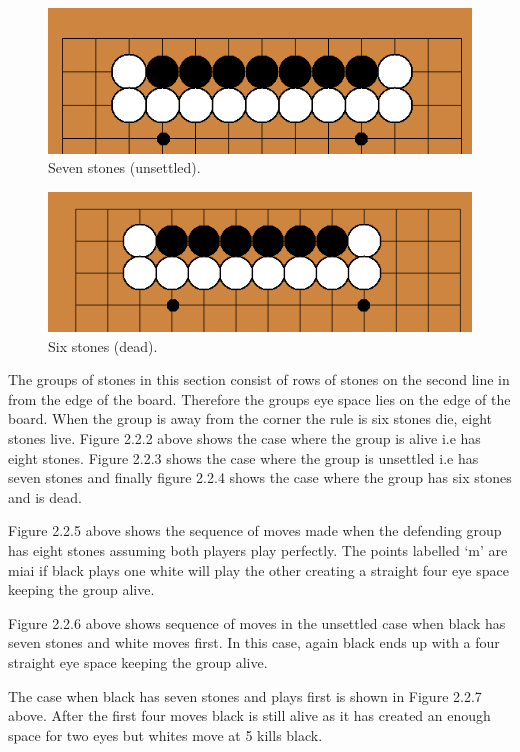 \documentclass{l3proj}
\begin{document}
\begin{figure}[H]
\centering
\includegraphics[scale=0.5]{Images/sevenunsettled.png}
\caption{Seven stones (unsettled).}
\end{figure}

\begin{figure}[H]
\centering
\includegraphics[scale=0.5]{Images/sixdie.png}
\caption{Six stones (dead).}
\end{figure}

The groups of stones in this section consist of rows of stones on the second line in from the edge of the board.  Therefore the groups eye space lies on the edge of the board. When the group is away from the corner the rule is six stones die, eight stones live. Figure 2.2.2 above shows the case where the group is alive i.e has eight stones. Figure 2.2.3 shows the case where the group is unsettled i.e has seven stones and finally figure 2.2.4 shows the case where the group has six stones and is dead.

Figure 2.2.5 above shows the sequence of moves made when the defending group has eight stones assuming both players play perfectly. The points labelled ‘m’ are miai if black plays one white will play the other creating a straight four eye space keeping the group alive.

Figure 2.2.6 above shows sequence of moves in the unsettled case when black has seven stones and white moves first.  In this case, again black ends up with a four straight eye space keeping the group alive.

The case when black has seven stones and plays first is shown in Figure 2.2.7 above. After the first four moves black is still alive as it has created an enough space for two eyes but whites move at 5 kills black.
\end{document}
